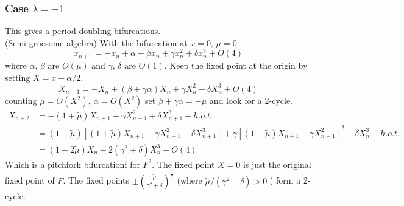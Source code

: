 \documentclass{article}
\begin{document}
\subsubsection{Case $\lambda = -1$}
This gives a period doubling bifurcations.
\\
(Semi-gruesome algebra)
With the bifurcation at $x=0, \, \mu =0$
\[ x_{n+1} = -x_n + \alpha + \beta x_n + \gamma x_n^2 + \delta x_n^3 + O(4)\]
where $\alpha,\,\beta$ are $O(\mu)$ and $\gamma,\,\delta$ are $O(1)$.
Keep the fixed point at the origin by setting $X = x - \alpha/2$.
\[X_{n+1} = -X_n + (\beta + \gamma \alpha)X_n + \gamma X_n^2 + \delta X_n^3
+O(4)\]
counting $\mu = O(X^2), \, \alpha = O(X^2)$ set $\beta + \gamma \alpha = 
-\tilde{\mu}$ and look for a 2-cycle.
\begin{align*}
X_{n+2 } &= - ( 1 + \tilde{\mu})X_{n+1} + \gamma X_{n+1}^2 + \delta 
X_{n+1}^3 + h.o.t. \\
&= (1 + \tilde{\mu})[ ( 1 + \tilde{\mu})X_{n+1} - \gamma X_{n+1}^2 - \delta 
X_{n+1}^3 ] + \gamma [( 1 + \tilde{\mu})X_{n+1} - \gamma X_{n+1}^2]^2 
- \delta X_n^3 + h.o.t.  \\
&= (1+2\tilde{\mu})X_n - 2(\gamma^2+\delta) X_n^3 + O(4)
\end{align*}
Which is a pitchfork bifurcationf for $F^2$. The fixed point $X=0$ is just the
original fixed point of $F$. The fixed points $\displaystyle \pm \left( 
\frac{\tilde{\mu}}{\gamma^2 + \delta} \right) ^{\frac{1}{2}}$ (where
$\tilde{\mu}/(\gamma^2+\delta) >0$ ) form a 2-cycle.
\end{document}
